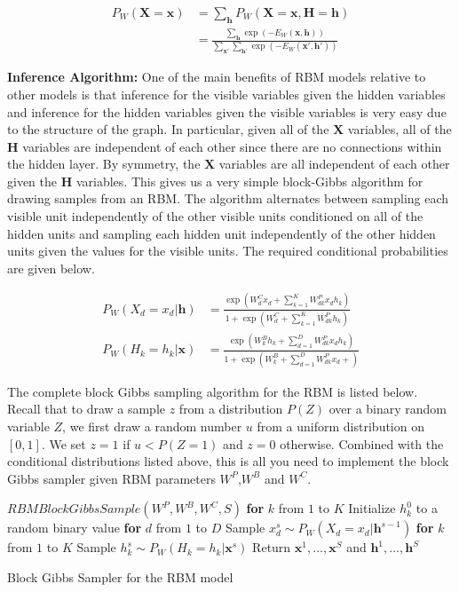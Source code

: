 \documentclass[11pt]{article}
\newcommand{\mbf}[1]{{\mathbf{#1}}}
\begin{document}
\begin{align}
\label{marginal-prob}
P_W(\mbf{X}=\mbf{x})&= \sum_{\mbf{h}}P_W(\mbf{X}=\mbf{x},\mbf{H}=\mbf{h}) \\
&=\frac{\sum_{\mbf{h}}\exp(-E_W(\mbf{x},\mbf{h}))}
{\sum_{\mbf{x}'}\sum_{\mbf{h}'}\exp(-E_W(\mbf{x}',\mbf{h}'))}
\end{align}


\textbf{Inference Algorithm:} One of the main benefits of RBM models relative to other models is that inference for the visible variables given the hidden variables and inference for the hidden variables given the visible variables is very easy due to the structure of the graph. In particular, given all of the $\mbf{X}$ variables, all of the $\mbf{H}$ variables are independent of each other since there are no connections within the hidden layer. By symmetry, the $\mbf{X}$ variables are all independent of each other given the $\mbf{H}$ variables. This gives us a very simple block-Gibbs algorithm for drawing samples from an RBM. The algorithm alternates between sampling each visible unit independently of the other visible units conditioned on all of the hidden units and sampling each hidden unit independently of the other hidden units given the values for the visible units. The required conditional probabilities are given below.

\begin{align}
\label{pxgh}
P_W(X_d=x_d|\mbf{h})&= \frac{\exp(W^C_dx_d + \sum_{k=1}^K W^P_{dk}x_dh_k)}
{1+ \exp(W^C_d + \sum_{k=1}^K W^P_{dk}h_k) }\\
\label{phgx}
P_W(H_k=h_k|\mbf{x})&= \frac{\exp(W^B_kh_k + \sum_{d=1}^D W^P_{dk}x_dh_k )}
{1+ \exp(W^B_k + \sum_{d=1}^D W^P_{dk}x_d + ) }
\end{align}

The complete block Gibbs sampling algorithm for the RBM is listed below. Recall that to draw a sample $z$ from a distribution $P(Z)$ over a binary random variable $Z$, we first draw a random number $u$ from a uniform distribution on $[0,1]$. We set $z=1$ if $u<P(Z=1)$ and $z=0$ otherwise. Combined with the conditional distributions listed above, this is all you need to implement the block Gibbs sampler given RBM parameters $W^P$,$W^B$ and $W^C$.\\

\begin{algorithm}[h!]
\begin{algorithmic}
\STATE $RBMBlockGibbsSample(W^P,W^B,W^C,S)$
\STATE \textbf{for} $k$ from $1$ to $K$ Initialize $h_k^0$ to a random binary value
\STATE \textbf{for} $d$ from $1$ to $D$ Sample $x_d^{s}\sim P_W(X_d=x_d|\mbf{h}^{s-1})$
\STATE \textbf{for} $k$ from $1$ to $K$ Sample $h_k^{s}\sim P_W(H_k=h_k|\mbf{x}^{s})$
\ENDFOR
\STATE Return $\mbf{x}^1,...,\mbf{x}^S$ and $\mbf{h}^1,...,\mbf{h}^S$
\end{algorithmic}
\caption{Block Gibbs Sampler for the RBM model}
\label{inference}
\end{algorithm}
\medskip
\end{document}
